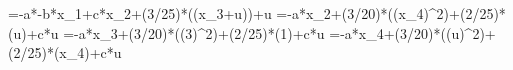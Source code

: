 =-a*-b*x_1+c*x_2+(3/25)*\sin((x_3+u))+u
=-a*x_2+(3/20)*\sin((x_4)^2)+(2/25)*\cos(u)+c*u
=-a*x_3+(3/20)*\sin((3)^2)+(2/25)*\cos(1)+c*u
=-a*x_4+(3/20)*\sin((u)^2)+(2/25)*\cos(x_4)+c*u
